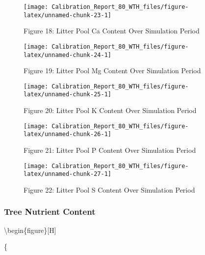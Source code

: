 \documentclass[
]{article}
\begin{document}
\begin{figure}[H]
\texttt{[image: Calibration\_Report\_80\_WTH\_files/figure-latex/unnamed-chunk-23-1]} \caption{Figure 18: Litter Pool Ca Content Over Simulation Period}\label{fig:unnamed-chunk-23}
\end{figure}

\begin{figure}[H]
\texttt{[image: Calibration\_Report\_80\_WTH\_files/figure-latex/unnamed-chunk-24-1]} \caption{Figure 19: Litter Pool Mg Content Over Simulation Period}\label{fig:unnamed-chunk-24}
\end{figure}

\begin{figure}[H]
\texttt{[image: Calibration\_Report\_80\_WTH\_files/figure-latex/unnamed-chunk-25-1]} \caption{Figure 20: Litter Pool K Content Over Simulation Period}\label{fig:unnamed-chunk-25}
\end{figure}

\begin{figure}[H]
\texttt{[image: Calibration\_Report\_80\_WTH\_files/figure-latex/unnamed-chunk-26-1]} \caption{Figure 21: Litter Pool P Content Over Simulation Period}\label{fig:unnamed-chunk-26}
\end{figure}

\begin{figure}[H]
\texttt{[image: Calibration\_Report\_80\_WTH\_files/figure-latex/unnamed-chunk-27-1]} \caption{Figure 22: Litter Pool S Content Over Simulation Period}\label{fig:unnamed-chunk-27}
\end{figure}

\hypertarget{tree-nutrient-content}{%
\subsubsection{Tree Nutrient Content}\label{tree-nutrient-content}}

\textbackslash begin\{figure\}{[}H{]}

\{\centering {}\newline{}
\end{document}

